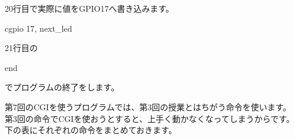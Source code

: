 20行目で実際に値をGPIO17へ書き込みます。

cgpio 17, next\_led




\bigskip

21行目の

end

でプログラムの終了をします。


\bigskip



第7回のCGIを使うプログラムでは、第3回の授業とはちがう命令を使います。\\
第3回の命令でCGIを使おうとすると、上手く動かなくなってしまうからです。\\
下の表にそれぞれの命令をまとめておきます。\\

\clearpage




